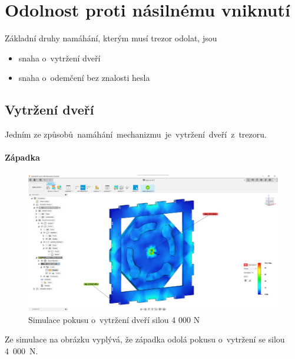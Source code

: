\newpage

\section{Odolnost proti násilnému vniknutí}
Základní druhy namáhání, kterým musí trezor odolat, jsou

\begin{itemize}
    \item snaha o~vytržení dveří 
    \item snaha o~odemčení bez znalosti hesla
\end{itemize}

\subsection*{Vytržení dveří}


Jedním ze způsobů~namáhání~mechanizmu~je~vytržení~dveří~z~trezoru.

\paragraph*{Západka}

\begin{figure}[htbp]
    \centering
    \includegraphics[width=\textwidth]{kapitoly/obrazky/M3/simulace/odolnost_proti_vytrzeni_4kN.png}
    \caption{Simulace pokusu o~vytržení dveří silou 4 000 N}
    \label{fig:M3-simulace-vytrzeni}
\end{figure}
Ze simulace na obrázku  vyplývá, že západka odolá pokusu o~vytržení se silou 4~000~N.



